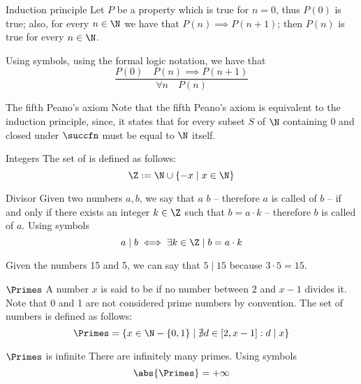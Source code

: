 \documentclass[a4paper, 12pt]{report}
\begin{document}
    \begin{framedprinc}{Induction principle}
        Let $P$ be a property which is true for $n = 0$, thus $P(0)$ is true; also, for every $n \in \N$ we have that $P(n) \implies P(n + 1)$; then $P(n)$ is true for every $n \in \N$.

        Using symbols, using the formal logic notation, we have that $$\dfrac{P(0) \quad P(n) \implies P(n + 1)}{ \forall n \quad P(n )}$$
    \end{framedprinc}

    \begin{framedobs}{The fifth Peano's axiom}
        Note that the fifth Peano's axiom is equivalent to the induction principle, since, it states that for every subset $S$ of $\N$ containing 0 and closed under $\succfn$ must be equal to $\N$ itself.
    \end{framedobs}

    \begin{frameddefn}{Integers}
        The set of  is defined as follows: $$\Z := \N \cup \{-x \mid x \in \N\}$$
    \end{frameddefn}

    \begin{frameddefn}{Divisor}
        Given two numbers $a, b$, we say that $a$  $b$ -- therefore $a$ is called  of $b$ -- if and only if there exists an integer $k \in \Z$ such that $b = a \cdot k$ -- therefore $b$ is called  of $a$. Using symbols $$a \mid b \iff \exists k \in \Z \mid b = a \cdot k$$
    \end{frameddefn}

    \begin{example}[Divisors]
        Given the numbers 15 and 5, we can say that $5 \mid 15$ because $3 \cdot 5 = 15$.
    \end{example}

    \begin{frameddefn}[label={primes}]{$\Primes$}
        A number $x$ is said to be  if no number between 2 and $x - 1$ divides it. Note that 0 and 1 are not considered prime numbers by convention. The set of  numbers is defined as follows: $$\Primes = \{ x \in \N - \{0, 1\} \mid \nexists d \in [2, x - 1] : d \mid x\}$$
    \end{frameddefn}

    \begin{framedprop}[label={primes inf}]{$\Primes$ is infinite}
        There are infinitely many primes. Using symbols $$\abs{\Primes} = + \infty$$
    \end{framedprop}
\end{document}
